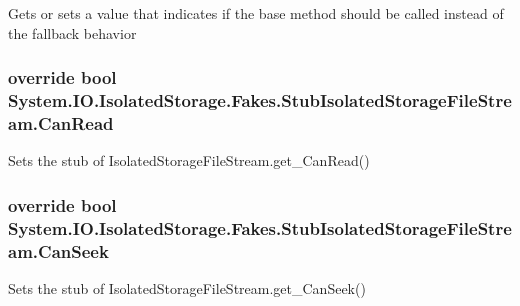 Gets or sets a value that indicates if the base method should be called instead of the fallback behavior

\hypertarget{class_system_1_1_i_o_1_1_isolated_storage_1_1_fakes_1_1_stub_isolated_storage_file_stream_af4238c174a235c6e9c212139f15c0eb6}{
\subsubsection[{Can\-Read}]{\setlength{\rightskip}{0pt plus 5cm}override bool System.\-I\-O.\-Isolated\-Storage.\-Fakes.\-Stub\-Isolated\-Storage\-File\-Stream.\-Can\-Read\hspace{0.3cm}{\ttfamily [get]}}}\label{class_system_1_1_i_o_1_1_isolated_storage_1_1_fakes_1_1_stub_isolated_storage_file_stream_af4238c174a235c6e9c212139f15c0eb6}


Sets the stub of Isolated\-Storage\-File\-Stream.\-get\-\_\-\-Can\-Read()

\hypertarget{class_system_1_1_i_o_1_1_isolated_storage_1_1_fakes_1_1_stub_isolated_storage_file_stream_a0966ff5c892ee23cee0a1a70f33ff932}{
\subsubsection[{Can\-Seek}]{\setlength{\rightskip}{0pt plus 5cm}override bool System.\-I\-O.\-Isolated\-Storage.\-Fakes.\-Stub\-Isolated\-Storage\-File\-Stream.\-Can\-Seek\hspace{0.3cm}{\ttfamily [get]}}}\label{class_system_1_1_i_o_1_1_isolated_storage_1_1_fakes_1_1_stub_isolated_storage_file_stream_a0966ff5c892ee23cee0a1a70f33ff932}


Sets the stub of Isolated\-Storage\-File\-Stream.\-get\-\_\-\-Can\-Seek()

